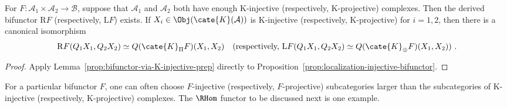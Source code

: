 \begin{proposition}\label{prop:bifunctor-via-K-injective}
	For $F:\mathcal{A}_1\times\mathcal{A}_2\to\mathcal{B}$, suppose that
	$\mathcal{A}_1$ and $\mathcal{A}_2$ both have enough K-injective
	(respectively, K-projective) complexes. Then the derived bifunctor
	$\mathrm{R}F$ (respectively, $\mathrm{L}F$) exists. If
	$X_i\in\Obj(\cate{K}(\mathcal{A}))$ is K-injective (respectively,
	K-projective) for $i=1,2$, then there is a canonical isomorphism
	\[ \mathrm{R}F(Q_1 X_1, Q_2 X_2) \simeq Q (\cate{K}_{\Pi} F)(X_1, X_2) \quad \text{(respectively, $\mathrm{L}F(Q_1 X_1, Q_2 X_2) \simeq Q (\cate{K}_{\oplus} F)(X_1, X_2)$) }. \]
\end{proposition}
\begin{proof}
	Apply Lemma~\ref{prop:bifunctor-via-K-injective-prep} directly to
	Proposition~\ref{prop:localization-injective-bifunctor}.
\end{proof}

For a particular bifunctor $F$, one can often choose $F$-injective
(respectively, $F$-projective) subcategories larger than the subcategories of
K-injective (respectively, K-projective) complexes. The $\RHom$ functor to be
discussed next is one example.

